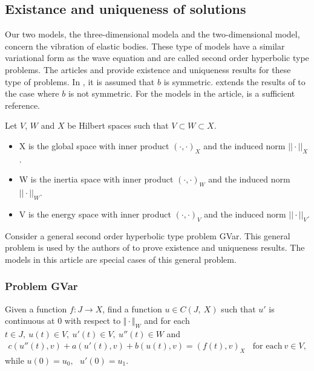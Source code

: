 	\subsection*{Existance and uniqueness of solutions}
		Our two models, the three-dimensional modela and the two-dimensional model, concern the vibration of elastic bodies. These type of models have a similar variational form as the wave equation and are called second order hyperbolic type problems. The articles \cite{VV02} and \cite{VS18} provide existence and uniqueness results for these type of problems. In \cite{VV02}, it is assumed that $b$ is symmetric. \cite{VS18} extends the results of \cite{VV02} to the case where $b$ is not symmetric. For the models in the article, \cite{VV02} is a sufficient reference.

		Let $V$, $W$ and $X$ be Hilbert spaces such that $V \subset W \subset X$.
		\begin{itemize}
			\item[] X is the global space with inner product $(\cdot,\cdot)_X$ and the induced norm $||\cdot||_X$.
			\item[] W is the inertia space with inner product $(\cdot,\cdot)_W$ and the induced norm $||\cdot||_W$.
			\item[] V is the energy space with inner product $(\cdot,\cdot)_V$ and the induced norm $||\cdot||_V$.
		\end{itemize}

		Consider a general second order hyperbolic type problem GVar. This general problem is used by the 
		authors of \cite{VV02} to prove existence and uniqueness results. The models in this article are 
		special cases of this general problem.

		\subsubsection*{Problem GVar}\label{sssec:existence:ProblemGVar}
		Given a function $f:J\rightarrow X$, find a function $u\in C(J,\ X)$ such that $u'$ is continuous at $0$ with respect to $\Vert \cdot \Vert_{W}$ and for each $t\in J,\ u(t)\in V,\ u'(t) \in V,\ u''(t)\in W$ and
		\begin{eqnarray}
			c(u''(t),v)+a(u'(t),v)+b(u(t),v)= (f(t),v)_{X} \ \ \ \ \textrm{for each} \ v \in V, \label{eq:existence:ProblemGVar}
		\end{eqnarray}
		while $u(0)=u_{0},\ \ \ u'(0)=u_{1}$.


